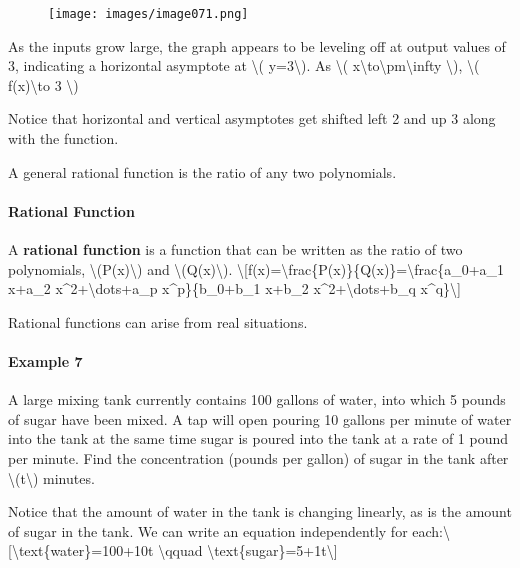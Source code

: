 \begin{figure}
\centering
\texttt{[image: images/image071.png]}
\caption{}
\end{figure}

As the inputs grow large, the graph appears to be leveling off at output
values of 3, indicating a horizontal asymptote at \textbackslash{}(
y=3\textbackslash{}). As \textbackslash{}(
x\textbackslash{}to\textbackslash{}pm\textbackslash{}infty
\textbackslash{}), \textbackslash{}( f(x)\textbackslash{}to 3
\textbackslash{})

Notice that horizontal and vertical asymptotes get shifted left 2 and up
3 along with the function.

A general rational function is the ratio of any two polynomials.

\hypertarget{rational-function}{%
\paragraph{Rational Function}\label{rational-function}}

A \textbf{rational function} is a function that can be written as the
ratio of two polynomials, \textbackslash{}(P(x)\textbackslash{}) and
\textbackslash{}(Q(x)\textbackslash{}).
\textbackslash{}{[}f(x)=\textbackslash{}frac\{P(x)\}\{Q(x)\}=\textbackslash{}frac\{a\_0+a\_1
x+a\_2 x\^{}2+\textbackslash{}dots+a\_p x\^{}p\}\{b\_0+b\_1 x+b\_2
x\^{}2+\textbackslash{}dots+b\_q x\^{}q\}\textbackslash{}{]}

Rational functions can arise from real situations.

\hypertarget{example-7}{%
\paragraph{Example 7}\label{example-7}}

A large mixing tank currently contains 100 gallons of water, into which
5 pounds of sugar have been mixed. A tap will open pouring 10 gallons
per minute of water into the tank at the same time sugar is poured into
the tank at a rate of 1 pound per minute. Find the concentration (pounds
per gallon) of sugar in the tank after
\textbackslash{}(t\textbackslash{}) minutes.

Notice that the amount of water in the tank is changing linearly, as is
the amount of sugar in the tank. We can write an equation independently
for each:\textbackslash{}{[}\textbackslash{}text\{water\}=100+10t
\textbackslash{}qquad
\textbackslash{}text\{sugar\}=5+1t\textbackslash{}{]}


